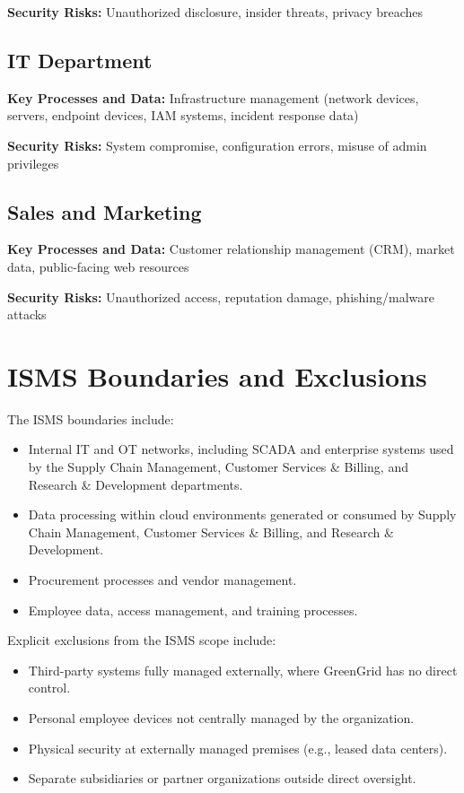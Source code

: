 \textbf{Security Risks:} Unauthorized disclosure, insider threats, privacy breaches

\subsection{IT Department}

\textbf{Key Processes and Data:} Infrastructure management (network devices, servers, endpoint devices, IAM systems, incident response data)  

\textbf{Security Risks:} System compromise, configuration errors, misuse of admin privileges

\subsection{Sales and Marketing}

\textbf{Key Processes and Data:} Customer relationship management (\ac{CRM}), market data, public-facing web resources  

\textbf{Security Risks:} Unauthorized access, reputation damage, phishing/malware attacks

\section{ISMS Boundaries and Exclusions}
\label{sec:boundaries}

The \ac{ISMS} boundaries include:
\begin{itemize}
    \item Internal \ac{IT} and \ac{OT} networks, including \ac{SCADA} and
          enterprise systems used by the Supply Chain Management, Customer Services
          \& Billing, and Research \& Development departments.
    \item Data processing within cloud environments
          generated or consumed by Supply Chain Management, Customer Services
          \& Billing, and Research \& Development.
    \item Procurement processes and vendor management.
    \item Employee data, access management, and training processes.
\end{itemize}

Explicit exclusions from the \ac{ISMS} scope include:
\begin{itemize}
    \item Third-party systems fully managed externally, where GreenGrid has
          no direct control.
    \item Personal employee devices not centrally managed by the organization.
    \item Physical security at externally managed premises (e.g., leased data centers).
    \item Separate subsidiaries or partner organizations outside direct oversight.
\end{itemize}

